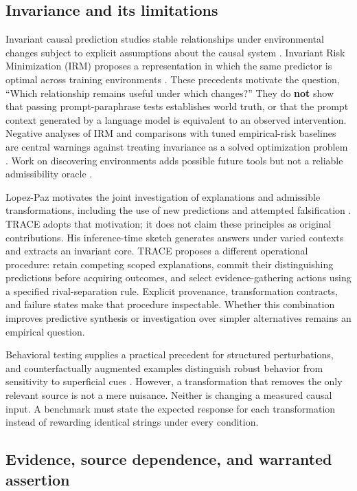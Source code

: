 \documentclass[11pt,a4paper]{article}
\begin{document}
\subsection{Invariance and its
limitations}\label{invariance-and-its-limitations}

Invariant causal prediction studies stable relationships under
environmental changes subject to explicit assumptions about the causal
system \citep{R03}. Invariant Risk Minimization (IRM) proposes a
representation in which the same predictor is optimal across training
environments \citep{R02}. These precedents motivate the question,
``Which relationship remains useful under which changes?'' They do
\textbf{not} show that passing prompt-paraphrase tests establishes world
truth, or that the prompt context generated by a language model is
equivalent to an observed intervention. Negative analyses of IRM and
comparisons with tuned empirical-risk baselines are central warnings
against treating invariance as a solved optimization problem
\citep{R04, R05, R06}. Work on discovering environments adds possible
future tools but not a reliable admissibility oracle \citep{R07}.

Lopez-Paz motivates the joint investigation of explanations and
admissible transformations, including the use of new predictions and
attempted falsification \citep{R01}. TRACE adopts that motivation; it
does not claim these principles as original contributions. His
inference-time sketch generates answers under varied contexts and
extracts an invariant core. TRACE proposes a different operational
procedure: retain competing scoped explanations, commit their
distinguishing predictions before acquiring outcomes, and select
evidence-gathering actions using a specified rival-separation rule.
Explicit provenance, transformation contracts, and failure states make
that procedure inspectable. Whether this combination improves predictive
synthesis or investigation over simpler alternatives remains an
empirical question.

Behavioral testing supplies a practical precedent for structured
perturbations, and counterfactually augmented examples distinguish
robust behavior from sensitivity to superficial cues \citep{R08, R09}.
However, a transformation that removes the only relevant source is not a
mere nuisance. Neither is changing a measured causal input. A benchmark
must state the expected response for each transformation instead of
rewarding identical strings under every condition.

\subsection{Evidence, source dependence, and warranted
assertion}\label{evidence-source-dependence-and-warranted-assertion}
\end{document}
